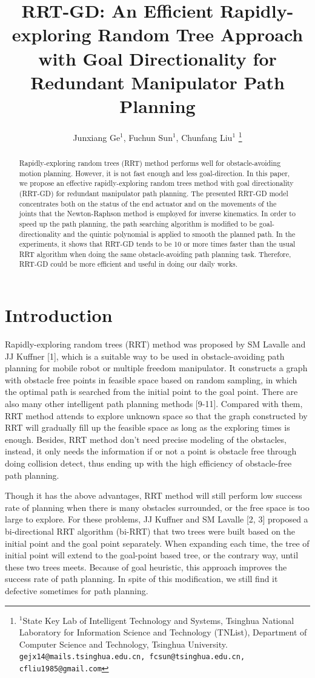 \documentclass[letterpaper, 10 pt, conference]{ieeeconf}  %
\title{\LARGE \bf
RRT-GD: An Efficient Rapidly-exploring Random Tree Approach with Goal Directionality for Redundant Manipulator Path Planning
}
\author{Junxiang Ge$^{1}$, Fuchun Sun$^{1}$, Chunfang Liu$^{1}$%
\thanks{$^{1}$State Key Lab of Intelligent Technology and Systems, Tsinghua National Laboratory for Information Science and Technology (TNList), Department of Computer Science and Technology, Tsinghua University. {\tt\small gejx14@mails.tsinghua.edu.cn, fcsun@tsinghua.edu.cn, cfliu1985@gmail.com}}%
}
\begin{document}
\maketitle
\thispagestyle{empty}
\pagestyle{empty}


\begin{abstract}
Rapidly-exploring random trees (RRT) method performs well for obstacle-avoiding motion planning. However, it is not fast enough and less goal-direction. In this paper, we propose an effective rapidly-exploring random trees method with goal directionality (RRT-GD)  for redundant manipulator path planning. The presented RRT-GD model concentrates both on the status of the end actuator and on the movements of the joints that the Newton-Raphson method is employed for inverse kinematics. In order to speed up the path planning, the path searching algorithm is modified to be goal-directionality and the quintic polynomial is applied to smooth the planned path. In the experiments, it shows that RRT-GD tends to be 10 or more times faster than the usual RRT algorithm when doing the same obstacle-avoiding path planning task. Therefore, RRT-GD could be more efficient and useful in doing our daily works.
\end{abstract}


\section{Introduction}
 Rapidly-exploring random trees (RRT) method was proposed by SM Lavalle and JJ Kuffner [1], which is a suitable way to be used in obstacle-avoiding path planning for mobile robot or multiple freedom manipulator. It constructs a graph with obstacle free points in feasible space based on random sampling, in which the optimal path is searched from the initial point to the goal point. There are also many other intelligent path planning methods [9-11]. Compared with them, RRT method attends to explore unknown space so that the graph constructed by RRT will gradually fill up the feasible space as long as the exploring times is enough. Besides, RRT method don't need precise modeling of the obstacles, instead, it only needs the information if or not a point is obstacle free through doing collision detect, thus ending up with the high efficiency of obstacle-free path planning.

Though it has the above advantages, RRT method will still perform low success rate of planning when there is many obstacles surrounded, or the free space is too large to explore. For these problems, JJ Kuffner and SM Lavalle [2, 3] proposed a bi-directional RRT algorithm (bi-RRT) that two trees were built based on the initial point and the goal point separately. When expanding each time, the tree of initial point will extend to the goal-point based tree, or the contrary way, until these two trees meets. Because of goal heuristic, this approach improves the success rate of path planning. In spite of this modification, we still find it defective sometimes for path planning.
\end{document}
